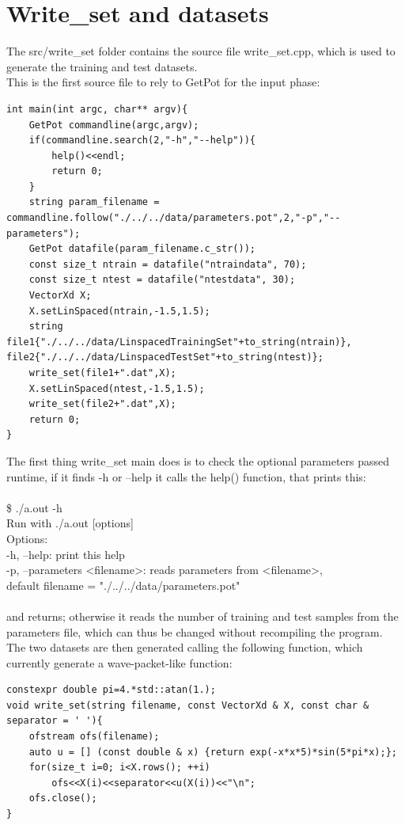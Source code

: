 \documentclass[12pt, a4paper]{report}
\theoremstyle{definition}
\begin{document}
\section{Write\_set and datasets}\label{section3.4}
The src/write\_set folder contains the source file write\_set.cpp, which is used to generate the training and test datasets.\\
This is the first source file to rely to GetPot for the input phase:
\begin{lstlisting}[frame=single, showstringspaces=false]
int main(int argc, char** argv){
	GetPot commandline(argc,argv);
	if(commandline.search(2,"-h","--help")){
		help()<<endl;
		return 0;
	}
	string param_filename = commandline.follow("./../../data/parameters.pot",2,"-p","--parameters");
	GetPot datafile(param_filename.c_str());
	const size_t ntrain = datafile("ntraindata", 70);
	const size_t ntest = datafile("ntestdata", 30);
	VectorXd X;
	X.setLinSpaced(ntrain,-1.5,1.5);
	string file1{"./../../data/LinspacedTrainingSet"+to_string(ntrain)}, file2{"./../../data/LinspacedTestSet"+to_string(ntest)};
	write_set(file1+".dat",X);
	X.setLinSpaced(ntest,-1.5,1.5);
	write_set(file2+".dat",X);
	return 0;
}
\end{lstlisting}
The first thing write\_set {\ttfamily main} does is to check the optional parameters passed runtime, if it finds {\ttfamily -h} or {\ttfamily --help} it calls the  help() function, that prints this:\\
{\\\ttfamily \$ ./a.out -h  \\
Run with ./a.out [options]\\
Options:\\
-h, --help: print this help\\
-p, --parameters <filename>: reads parameters from <filename>,\\
          default filename = "./../../data/parameters.pot"\\\\}
and returns; otherwise it reads the number of training and test samples from the parameters file, which can thus be changed without recompiling the program. 
\newpage\noindent The two datasets are then generated calling the following function, which currently generate a wave-packet-like function:
\begin{lstlisting}[frame=single, showstringspaces=false]
constexpr double pi=4.*std::atan(1.);
void write_set(string filename, const VectorXd & X, const char & separator = ' '){
	ofstream ofs(filename);
	auto u = [] (const double & x) {return exp(-x*x*5)*sin(5*pi*x);};	
	for(size_t i=0; i<X.rows(); ++i)
		ofs<<X(i)<<separator<<u(X(i))<<"\n";
	ofs.close();
}
\end{lstlisting}
\end{document}
